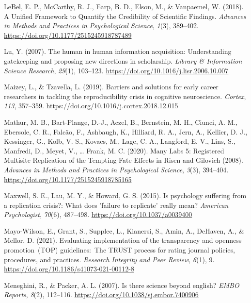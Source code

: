 \documentclass[
  man,mask,floatsintext]{apa7}
\newlength{\cslhangindent}
\newlength{\cslentryspacingunit} %
\newenvironment{CSLReferences}[2] %
 {%
  \setlength{\parindent}{0pt}
  \ifodd #1
  \let\oldpar\par
  \def\par{\hangindent=\cslhangindent\oldpar}
  \fi
  \setlength{\parskip}{#2\cslentryspacingunit}
 }%
 {}
\begin{document}
\begin{CSLReferences}{1}{0}
\leavevmode{}%
LeBel, E. P., McCarthy, R. J., Earp, B. D., Elson, M., \& Vanpaemel, W. (2018). A Unified Framework to Quantify the Credibility of Scientific Findings. \emph{Advances in Methods and Practices in Psychological Science}, \emph{1}(3), 389--402. \url{https://doi.org/10.1177/2515245918787489}

\leavevmode{}%
Lu, Y. (2007). The human in human information acquisition: Understanding gatekeeping and proposing new directions in scholarship. \emph{Library \& Information Science Research}, \emph{29}(1), 103--123. \url{https://doi.org/10.1016/j.lisr.2006.10.007}

\leavevmode{}%
Maizey, L., \& Tzavella, L. (2019). Barriers and solutions for early career researchers in tackling the reproducibility crisis in cognitive neuroscience. \emph{Cortex}, \emph{113}, 357--359. \url{https://doi.org/10.1016/j.cortex.2018.12.015}

\leavevmode{}%
Mathur, M. B., Bart-Plange, D.-J., Aczel, B., Bernstein, M. H., Ciunci, A. M., Ebersole, C. R., Falcão, F., Ashbaugh, K., Hilliard, R. A., Jern, A., Kellier, D. J., Kessinger, G., Kolb, V. S., Kovacs, M., Lage, C. A., Langford, E. V., Lins, S., Manfredi, D., Meyet, V., \ldots{} Frank, M. C. (2020). Many Labs 5: Registered Multisite Replication of the Tempting-Fate Effects in Risen and Gilovich (2008). \emph{Advances in Methods and Practices in Psychological Science}, \emph{3}(3), 394--404. \url{https://doi.org/10.1177/2515245918785165}

\leavevmode{}%
Maxwell, S. E., Lau, M. Y., \& Howard, G. S. (2015). Is psychology suffering from a replication crisis?: What does 'failure to replicate' really mean? \emph{American Psychologist}, \emph{70}(6), 487--498. \url{https://doi.org/10.1037/a0039400}

\leavevmode{}%
Mayo-Wilson, E., Grant, S., Supplee, L., Kianersi, S., Amin, A., DeHaven, A., \& Mellor, D. (2021). Evaluating implementation of the transparency and openness promotion~(TOP) guidelines:~The TRUST process for rating journal policies, procedures, and practices. \emph{Research Integrity and Peer Review}, \emph{6}(1), 9. \url{https://doi.org/10.1186/s41073-021-00112-8}

\leavevmode{}%
Meneghini, R., \& Packer, A. L. (2007). Is there science beyond english? \emph{EMBO Reports}, \emph{8}(2), 112--116. \url{https://doi.org/10.1038/sj.embor.7400906}


\end{CSLReferences}
\end{document}

